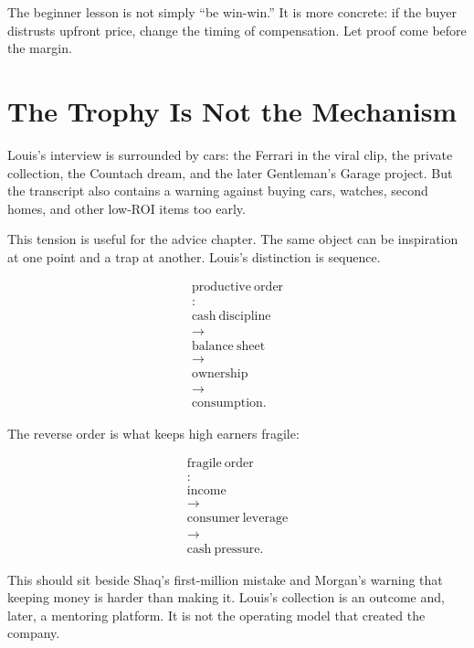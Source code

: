 \documentclass[11pt,oneside]{book}
\begin{document}
The beginner lesson is not simply ``be win-win.'' It is more concrete: if the buyer distrusts upfront price, change the timing of compensation. Let proof come before the margin.

\section{The Trophy Is Not the Mechanism}

Louis's interview is surrounded by cars: the Ferrari in the viral clip, the private collection, the Countach dream, and the later Gentleman’s Garage project. But the transcript also contains a warning against buying cars, watches, second homes, and other low-ROI items too early.

This tension is useful for the advice chapter. The same object can be inspiration at one point and a trap at another. Louis's distinction is sequence.

\begin{equation}
\begin{gathered}
\mathrm{productive\ order}\\
:\\
\mathrm{cash\ discipline}\\
\rightarrow\\
\mathrm{balance\ sheet}\\
\rightarrow\\
\mathrm{ownership}\\
\rightarrow\\
\mathrm{consumption}.
\end{gathered}
\end{equation}

The reverse order is what keeps high earners fragile:

\begin{equation}
\begin{gathered}
\mathrm{fragile\ order}\\
:\\
\mathrm{income}\\
\rightarrow\\
\mathrm{consumer\ leverage}\\
\rightarrow\\
\mathrm{cash\ pressure}.
\end{gathered}
\end{equation}

This should sit beside Shaq's first-million mistake and Morgan's warning that keeping money is harder than making it. Louis's collection is an outcome and, later, a mentoring platform. It is not the operating model that created the company.
\end{document}

